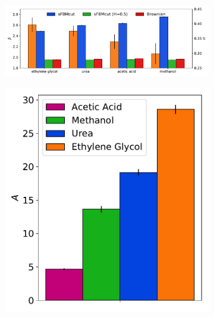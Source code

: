 \documentclass[aps,pre,preprint,groupedaddress]{revtex4-2}
\begin{document}
  \begin{figure}
  \centering
  \begin{subfigure}{\textwidth}
  \includegraphics[width=\textwidth]{hurst_beta_variations.pdf}
  \caption*{}\label{fig:beta_hurst}
  \end{subfigure}
  \begin{subfigure}{0.31\textwidth}
  \includegraphics[width=\textwidth]{c_parameter_comparison.pdf}
  \caption*{}\label{fig:c_parameters}
  \end{subfigure}
  \begin{subfigure}{0.66\textwidth}

\end{subfigure}
\end{figure}
\end{document}
